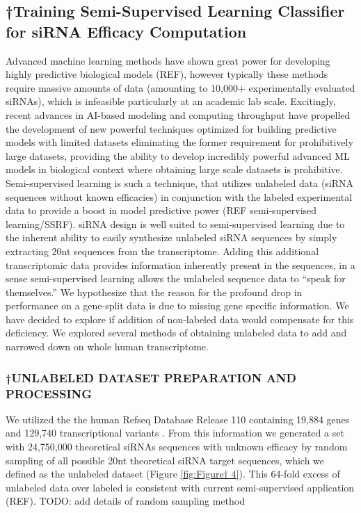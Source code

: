 \documentclass{report}
\begin{document}
\subsection{†Training Semi-Supervised Learning Classifier for siRNA Efficacy Computation}

Advanced machine learning methods have shown great power for developing highly predictive biological models (REF), however typically these methods require massive amounts of data (amounting to 10,000+ experimentally evaluated siRNAs), which is infeasible particularly at an academic lab scale. Excitingly, recent advances in AI-based modeling and computing throughput have propelled the development of new powerful techniques optimized for building predictive models with limited datasets eliminating the former requirement for prohibitively large datasets, providing the ability to develop incredibly powerful advanced ML models in biological context where obtaining large scale datasets is prohibitive. Semi-supervised learning is such a technique, that utilizes unlabeled data (siRNA sequences without known efficacies) in conjunction with the labeled experimental data to provide a boost in model predictive power (REF semi-supervised learning/SSRF). 
siRNA design is well suited to semi-supervised learning due to the inherent ability to easily synthesize unlabeled siRNA sequences by simply extracting 20nt sequences from the transcriptome. Adding this additional transcriptomic data provides information inherently present in the sequences, in a sense semi-supervised learning allows the unlabeled sequence data to “speak for themselves.” We hypothesize that the reason for the profound drop in performance on a gene-split data is due to missing gene specific information. We have decided to explore if addition of non-labeled data would compensate for this deficiency. We explored several methods of obtaining unlabeled data to add and narrowed down on whole human transcriptome. 

\subsubsection{†UNLABELED DATASET PREPARATION AND PROCESSING}
We utilized the the human Refseq Database Release 110 containing 19,884 genes and 129,740 transcriptional variants \cite{oleary_reference_2016}. From this information we generated a set with 24,750,000 theoretical siRNAs sequences with unknown efficacy by random sampling of all possible 20nt theoretical siRNA target sequences, which we defined as the unlabeled dataset (Figure \ref{fig:Figure† 4}). This 64-fold excess of unlabeled data over labeled is consistent with current semi-supervised application (REF). TODO: add details of random sampling method
\end{document}
